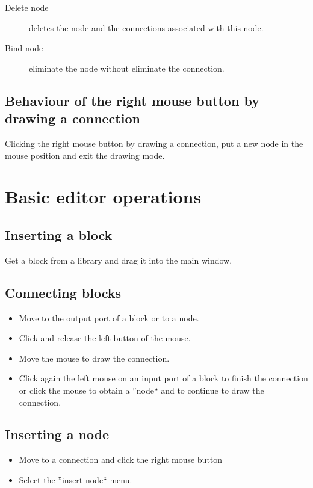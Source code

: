 \begin{description}
\item[Delete node] deletes the node and the connections associated with this 
node.
\item [Bind node] eliminate the node without eliminate the connection.
\end{description}

\subsection{Behaviour of the right mouse button by drawing a connection}
Clicking the right mouse button by drawing a connection, put a new node in the 
mouse position and exit the drawing mode.

\section{Basic editor operations}

\subsection{Inserting a block}
Get a block from a library and drag it into the main window.

\subsection{Connecting blocks}
\begin{itemize}
\item Move to the output port of a block or to a node.
\item Click and release the left button of the mouse.
\item Move the mouse to draw the connection.
\item Click again the left mouse on an input port of a block to finish the 
connection or click the mouse to obtain a ''node`` and to continue to draw the 
connection.
\end{itemize}

\subsection{Inserting a node}
\begin{itemize}
\item Move to a connection and click the right mouse button
\item Select the ''insert node`` menu.
\end{itemize}

